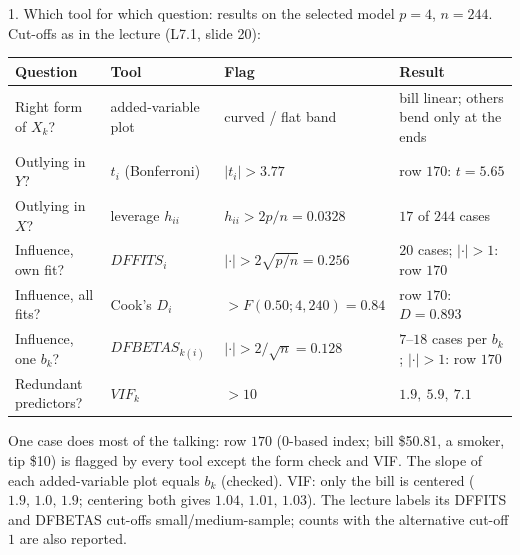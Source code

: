 \documentclass[aspectratio=169,11pt]{beamer}
\begin{document}
\begin{frame}{1. Which tool for which question: results on the selected model}
  \small
  $p=4$, $n=244$. Cut-offs as in the lecture (L7.1, slide 20):

  \vspace{0.2em}
  {\scriptsize\setlength{\tabcolsep}{3pt}
  \begin{tabular}{@{}lllp{4.9cm}@{}}
    \toprule
    Question & Tool & Flag & Result \\
    \midrule
    Right form of $X_k$?  & added-variable plot & curved / flat band & bill linear; others bend only at the ends \\
    Outlying in $Y$?      & $t_i$ (Bonferroni)  & $|t_i|>3.77$       & row $170$: $t=5.65$ \\
    Outlying in $X$?      & leverage $h_{ii}$   & $h_{ii}>2p/n=0.0328$ & $17$ of $244$ cases \\
    Influence, own fit?   & $DFFITS_i$          & $|\cdot|>2\sqrt{p/n}=0.256$ & $20$ cases; $|\cdot|>1$: row $170$ \\
    Influence, all fits?  & Cook's $D_i$        & $>F(0.50;4,240)=0.84$ & row $170$: $D=0.893$ \\
    Influence, one $b_k$? & $DFBETAS_{k(i)}$    & $|\cdot|>2/\sqrt n=0.128$ & $7$--$18$ cases per $b_k$; $|\cdot|>1$: row $170$ \\
    Redundant predictors? & $VIF_k$             & $>10$              & $1.9,\ 5.9,\ 7.1$ \\
    \bottomrule
  \end{tabular}}

  \vspace{0.4em}
  \small
  One case does most of the talking: row $170$ (0-based index; bill \$50.81, a smoker,
  tip \$10) is flagged by every tool except the form check and VIF.
  The slope of each added-variable plot equals $b_k$ (checked). VIF: only the bill is
  centered ($1.9,\,1.0,\,1.9$; centering both gives $1.04,\,1.01,\,1.03$).
  The lecture labels its DFFITS and DFBETAS cut-offs small/medium-sample;
  counts with the alternative cut-off $1$ are also reported.
\end{frame}
\end{document}
